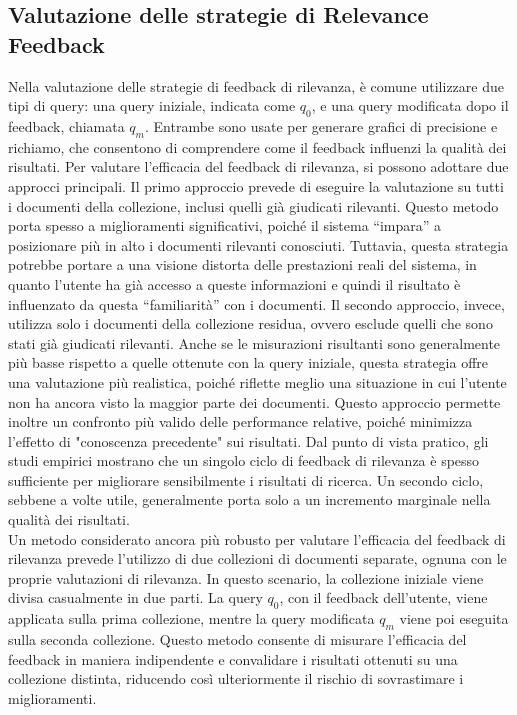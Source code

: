 \documentclass{report}
\begin{document}
	\subsection{Valutazione delle strategie di Relevance Feedback}
	Nella valutazione delle strategie di feedback di rilevanza, è comune utilizzare due tipi di query: una query iniziale, indicata come $q_0$, e una query modificata dopo il feedback, chiamata $q_m$. Entrambe sono usate per generare grafici di precisione e richiamo, che consentono di comprendere come il feedback influenzi la qualità dei risultati.
	Per valutare l’efficacia del feedback di rilevanza, si possono adottare due approcci principali. Il primo approccio prevede di eseguire la valutazione su tutti i documenti della collezione, inclusi quelli già giudicati rilevanti. Questo metodo porta spesso a miglioramenti significativi, poiché il sistema “impara” a posizionare più in alto i documenti rilevanti conosciuti. Tuttavia, questa strategia potrebbe portare a una visione distorta delle prestazioni reali del sistema, in quanto l'utente ha già accesso a queste informazioni e quindi il risultato è influenzato da questa “familiarità” con i documenti. Il secondo approccio, invece, utilizza solo i documenti della collezione residua, ovvero esclude quelli che sono stati già giudicati rilevanti. Anche se le misurazioni risultanti sono generalmente più basse rispetto a quelle ottenute con la query iniziale, questa strategia offre una valutazione più realistica, poiché riflette meglio una situazione in cui l'utente non ha ancora visto la maggior parte dei documenti. Questo approccio permette inoltre un confronto più valido delle performance relative, poiché minimizza l’effetto di "conoscenza precedente" sui risultati.
	Dal punto di vista pratico, gli studi empirici mostrano che un singolo ciclo di feedback di rilevanza è spesso sufficiente per migliorare sensibilmente i risultati di ricerca. Un secondo ciclo, sebbene a volte utile, generalmente porta solo a un incremento marginale nella qualità dei risultati.
	\vspace{\baselineskip}\\
	Un metodo considerato ancora più robusto per valutare l’efficacia del feedback di rilevanza prevede l’utilizzo di due collezioni di documenti separate, ognuna con le proprie valutazioni di rilevanza. In questo scenario, la collezione iniziale viene divisa casualmente in due parti. La query $q_0$, con il feedback dell'utente, viene applicata sulla prima collezione, mentre la query modificata $q_m$ viene poi eseguita sulla seconda collezione. Questo metodo consente di misurare l'efficacia del feedback in maniera indipendente e convalidare i risultati ottenuti su una collezione distinta, riducendo così ulteriormente il rischio di sovrastimare i miglioramenti.
\end{document}

